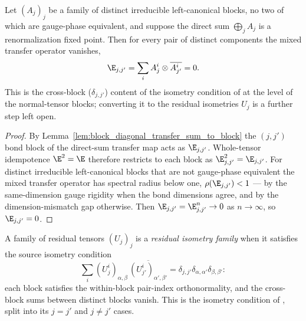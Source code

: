 \begin{theorem}%
    \label{thm:bnt_locally_orthogonal_of_rfp_direct_sum}
    \leanok
    Let $(A_j)_j$ be a family of distinct irreducible left-canonical blocks, no
    two of which are gauge-phase equivalent, and suppose the direct sum
    $\bigoplus_j A_j$ is a renormalization fixed point. Then for every pair of
    distinct components the mixed transfer operator vanishes,
    \[
        \E_{j,j'} = \sum_i A_j^i\otimes\overline{A_{j'}^i} = 0 .
    \]
    This is the cross-block ($\delta_{j,j'}$) content of the isometry condition
    of \cite[Theorem~III \& Corollary~III.3]{Cirac2016MPDO_arXiv} at the level of
    the normal-tensor blocks; converting it to the residual isometries $U_j$ is a
    further step left open.
\end{theorem}
\begin{proof}\leanok
    By Lemma~\ref{lem:block_diagonal_transfer_sum_to_block} the $(j,j')$ bond
    block of the direct-sum transfer map acts as $\E_{j,j'}$. Whole-tensor
    idempotence $\E^2=\E$ therefore restricts to each block as
    $\E_{j,j'}^2=\E_{j,j'}$. For distinct irreducible left-canonical blocks that
    are not gauge-phase equivalent the mixed transfer operator has spectral radius
    below one, $\rho(\E_{j,j'})<1$ --- by the same-dimension gauge rigidity when
    the bond dimensions agree, and by the dimension-mismatch gap otherwise. Then
    $\E_{j,j'} = \E_{j,j'}^n \to 0$ as $n\to\infty$, so $\E_{j,j'}=0$.
\end{proof}

\begin{definition}%
    \label{def:is_residual_isometry_family}
    \leanok
    A family of residual tensors $(U_j)_j$ is a \emph{residual isometry family}
    when it satisfies the source isometry condition
    \[
        \sum_i (U_j^i)_{\alpha,\beta}\,\overline{(U_{j'}^i)_{\alpha',\beta'}}
        = \delta_{j,j'}\delta_{\alpha,\alpha'}\delta_{\beta,\beta'} :
    \]
    each block satisfies the within-block pair-index orthonormality, and the
    cross-block sums between distinct blocks vanish. This is the isometry
    condition of \cite[Theorem~III]{Cirac2016MPDO_arXiv}, split into its $j=j'$
    and $j\ne j'$ cases.
\end{definition}


